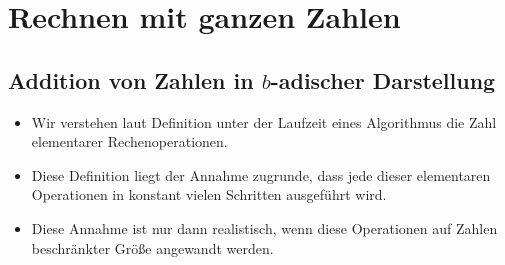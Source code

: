 \documentclass[a4paper,12pt]{article}
\theoremstyle{definition}
\begin{document}
	\setcounter{section}{2}
	\section{Rechnen mit ganzen Zahlen}
	\subsection{Addition von Zahlen in $b$-adischer Darstellung}
	\begin{itemize}
		\item Wir verstehen laut Definition unter der Laufzeit eines Algorithmus die Zahl elementarer Rechenoperationen.
		\item Diese Definition liegt der Annahme zugrunde, dass jede dieser elementaren Operationen in konstant vielen Schritten ausgeführt wird.
		\item Diese Annahme ist nur dann realistisch, wenn diese Operationen auf Zahlen beschränkter Größe angewandt werden.
	\end{itemize}
	
\end{document}
